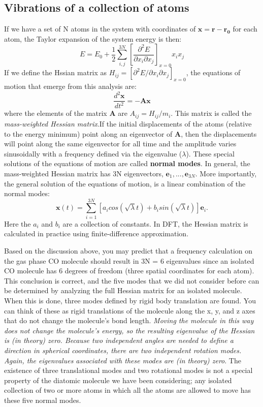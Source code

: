 \documentclass[12pt]{article}
\begin{document}
\subsection{Vibrations of a collection of atoms}
If we have a set of N atoms in the system with coordinates of $\boldsymbol{x}=\boldsymbol{r}-\boldsymbol{r_0}$ for each atom, the Taylor expansion of the system energy is then:
\begin{equation}
    E=E_0+\frac{1}{2}\sum_{i,j}^{3N}[\frac{\partial^2 E}{\partial x_i\partial x_j}]_{x=0}x_ix_j
\end{equation}
If we define the Hssian matrix as $H_{ij}=[\partial^2 E/\partial x_i\partial x_j]_{x=0}$, the equations of motion that emerge from this analysis are:
\begin{equation}
    \frac{d^2\boldsymbol{x}}{dt^2}=-\boldsymbol{A}\boldsymbol{x}
\end{equation}
where the elements of the matrix $\boldsymbol{A}$ are $A_{ij}=H_{ij}/m_i$. This matrix is called the \textit{mass-weighted Hessian matrix}.If the initial displacements of the atoms (relative to the energy minimum) point along an
eigenvector of $\boldsymbol{A}$, then the displacements will point along the same eigenvector for all time and the amplitude varies sinusoidally with a frequency defined via the eigenvalue ($\lambda$). These special solutions of the equations of motion are called \textbf{normal modes}. In general, the mass-weighted Hessian matrix has 3N eigenvectors, $\boldsymbol{e}_1,...,\boldsymbol{e}_{3N}$. More importantly, the general solution of the equations of motion, is a linear combination of the normal modes:
\begin{equation}
    \boldsymbol{x}(t) = \sum_{i=1}^{3N}[a_icos(\sqrt{\lambda}t)+b_isin(\sqrt{\lambda}t)]\boldsymbol{e}_i.
\end{equation}
Here the $a_i$ and $b_i$ are a collection of constants. In DFT, the Hessian matrix is calculated in practice using finite-difference approximation.

Based on the discussion above, you may predict that a frequency calculation on the gas phase CO molecule should result in 3N = 6 eigenvalues since an isolated CO molecule has 6 degrees of freedom (three spatial coordinates for each atom). This conclusion is correct, and the five modes that we did not consider before can be determined by analyzing the full Hessian matrix for an isolated molecule. When this is done, three modes defined by rigid body translation are found. You can think of these as rigid translations of the molecule along the x, y, and z axes that do not change the molecule’s bond length. \emph{Moving the molecule in this way does not change the molecule’s energy, so the resulting eigenvalue of the Hessian is (in theory) zero. Because two independent angles are needed to define a direction in spherical coordinates, there are two independent rotation modes. Again, the eigenvalues associated with these modes are (in theory) zero}. The existence of three translational modes and two rotational modes is not a special property of the diatomic molecule we have been considering; any isolated collection of two or more atoms in which all the atoms are allowed to move has these five normal modes.
\end{document}

